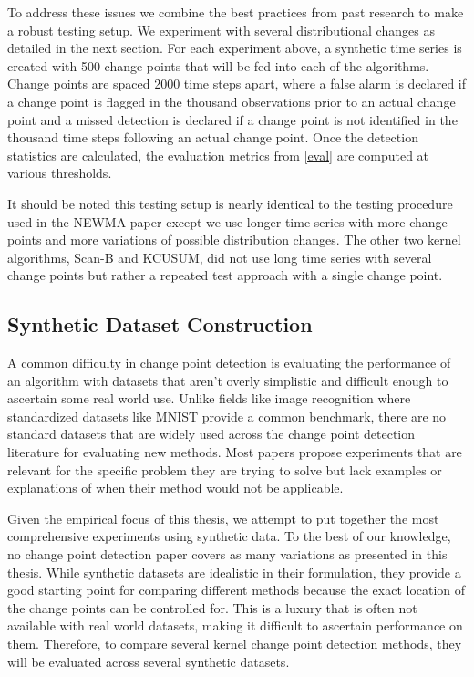 To address these issues we combine the best practices from past research to make a robust testing setup. We experiment with several distributional changes as detailed in the next section. For each experiment above, a synthetic time series is created with 500 change points that will be fed into each of the algorithms. Change points are spaced 2000 time steps apart, where a false alarm is declared if a change point is flagged in the thousand observations prior to an actual change point and a missed detection is declared if a change point is not identified in the thousand time steps following an actual change point. Once the detection statistics are calculated, the evaluation metrics from \ref{eval} are computed at various thresholds. 

It should be noted this testing setup is nearly identical to the testing procedure used in the NEWMA paper except we use longer time series with more change points and more variations of possible distribution changes. The other two kernel algorithms, Scan-B and KCUSUM, did not use long time series with several change points but rather a repeated test approach with a single change point. 

\subsection{Synthetic Dataset Construction}
A common difficulty in change point detection is evaluating the performance of an algorithm with datasets that aren't overly simplistic and difficult enough to ascertain some real world use. Unlike fields like image recognition where standardized datasets like MNIST provide a common benchmark, there are no standard datasets that are widely used across the change point detection literature for evaluating new methods. Most papers propose experiments that are relevant for the specific problem they are trying to solve  but lack examples or explanations of when their method would not be applicable.  %

Given the empirical focus of this thesis, we attempt to put together the most comprehensive experiments using synthetic data. To the best of our knowledge, no change point detection paper covers as many variations as presented in this thesis. While synthetic datasets are idealistic in their formulation, they provide a good starting point for comparing different methods because the exact location of the change points can be controlled for. This is a luxury that is often not available with real world datasets, making it difficult to ascertain performance on them. Therefore, to compare several kernel change point detection methods, they will be evaluated across several synthetic datasets.

